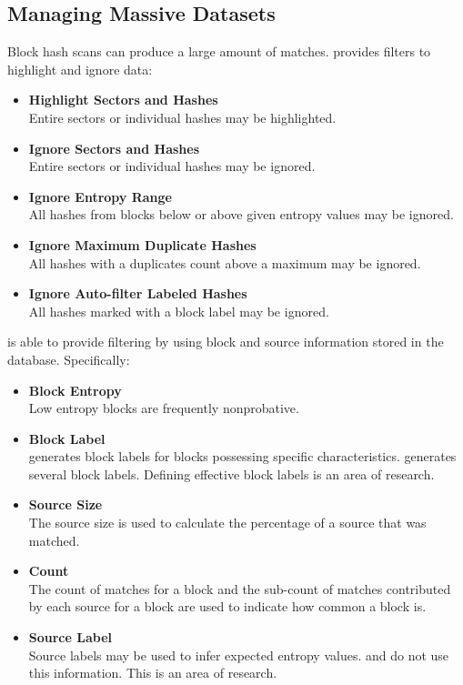 \documentclass[11pt,fleqn]{article} %
\begin{document}
\subsection{Managing Massive Datasets}
Block hash scans can produce a large amount of matches. \sscope provides filters to highlight and ignore data:
\begin{itemize}
\item \textbf{Highlight Sectors and Hashes}\\
Entire sectors or individual hashes may be highlighted.
\item \textbf{Ignore Sectors and Hashes}\\
Entire sectors or individual hashes may be ignored.
\item \textbf{Ignore Entropy Range}\\
All hashes from blocks below or above given entropy values may be ignored.
\item \textbf{Ignore Maximum Duplicate Hashes}\\
All hashes with a duplicates count above a maximum may be ignored.
\item \textbf{Ignore Auto-filter Labeled Hashes}\\
All hashes marked with a block label may be ignored.
\end{itemize}
\sscope is able to provide filtering by using block and source information stored in the \hdb database. Specifically:
\begin{itemize}
\item \textbf{Block Entropy}\\
Low entropy blocks are frequently nonprobative.
\item \textbf{Block Label}\\
\hdb generates block labels for blocks possessing specific characteristics. \hdb generates several block labels. Defining effective block labels is an area of research.
\item \textbf{Source Size}\\
The source size is used to calculate the percentage of a source that was matched.
\item \textbf{Count}\\
The count of matches for a block and the sub-count of matches contributed by each source for a block are used to indicate how common a block is.
\item \textbf{Source Label}\\
Source labels may be used to infer expected entropy values. \hdb and \sscope do not use this information. This is an area of research.
\end{itemize}
\end{document}
